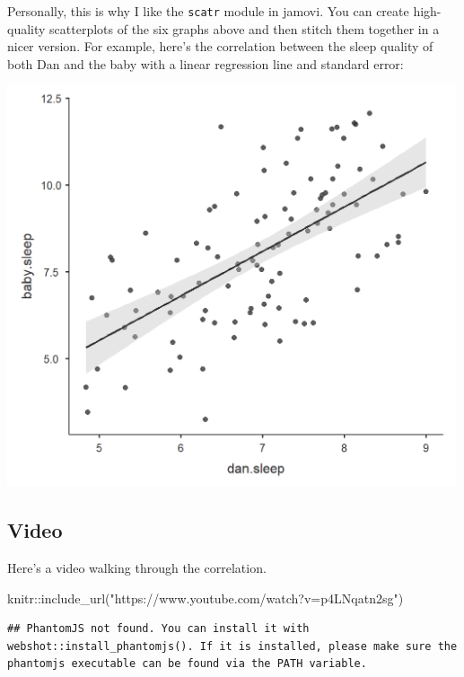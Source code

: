 \documentclass[
]{book}
\newenvironment{Shaded}{\begin{snugshade}}{\end{snugshade}}
\newcommand{\FunctionTok}[1]{\textcolor[rgb]{0.00,0.00,0.00}{#1}}
\newcommand{\NormalTok}[1]{#1}
\newcommand{\SpecialCharTok}[1]{\textcolor[rgb]{0.00,0.00,0.00}{#1}}
\newcommand{\StringTok}[1]{\textcolor[rgb]{0.31,0.60,0.02}{#1}}
\begin{document}
Personally, this is why I like the \texttt{scatr} module in jamovi. You can create high-quality scatterplots of the six graphs above and then stitch them together in a nicer version. For example, here's the correlation between the sleep quality of both Dan and the baby with a linear regression line and standard error:

\includegraphics[width=5.20833in,height=\textheight]{images/08-correlation/correlation-plot1.png}

\hypertarget{video-9}{%
\subsection{Video}\label{video-9}}

Here's a video walking through the correlation.

\begin{Shaded}
\begin{Highlighting}[]
\NormalTok{knitr}\SpecialCharTok{::}\FunctionTok{include\_url}\NormalTok{(}\StringTok{"https://www.youtube.com/watch?v=p4LNqatn2sg"}\NormalTok{)}
\end{Highlighting}
\end{Shaded}

\begin{verbatim}
## PhantomJS not found. You can install it with webshot::install_phantomjs(). If it is installed, please make sure the phantomjs executable can be found via the PATH variable.
\end{verbatim}
\end{document}
